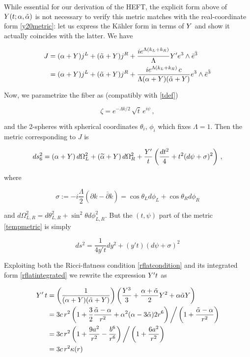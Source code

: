 While essential for our derivation of the HEFT, the explicit form above of $Y(t;\alpha,\tilde\alpha)$ is not necessary to verify this metric matches with the real-coordinate form \eqref{y20metric}: let us express the K\"ahler form in terms of $Y$ and show it actually coincides with the latter. We have

\begin{align}
	\label{Jintermsofy}
	J & =  (\alpha + Y) j^L + (\tilde{\alpha} + Y) j^R + \frac{ie^{\Lambda (k_L + k_R)}}\Lambda Y' e^3 \wedge \bar e^{\bar 3}\\
	  & =  (\alpha + Y) j^L + (\tilde{\alpha} + Y) j^R + \frac{ie^{\Lambda (k_L + k_R)} \,c}{\Lambda (\alpha + Y)(\tilde{\alpha} + Y)} e^3 \wedge \bar e^{\bar 3}
\end{align}

Now, we parametrize the fiber as (compatibly with \eqref{tdef}) 

\begin{equation}
	\zeta = e^{-\Lambda k/2}\, \sqrt{t} \,e^{i\psi}\,,
\end{equation}

and the 2-spheres with spherical coordinates $\theta_i$, $\phi_i$ which fixes $\Lambda = 1$. Then the metric corresponding to $J$ is

\begin{equation}
	ds_6^2 = (\alpha+Y)\, d\Omega^2_L + (\widetilde{\alpha} + Y) \,d\Omega^2_R + \frac{Y'}{t} \left( \frac{dt^2}{4} + t^2 (d\psi + \sigma)^2 \right)\,,\label{tempmetric}
\end{equation}

where 

\begin{equation}
	\sigma := -i\frac{\Lambda}{2}(\partial k - \bar \partial k) = \cos\theta_L d\phi_L + \cos\theta_R d\phi_R
	\label{}
\end{equation}

and $d\Omega_{L,R}^2 = d\theta_{L,R}^2 + \sin^2\theta  d\phi^2_{L,R}$. But the $(t,\psi)$ part of the metric \eqref{tempmetric} is simply

\begin{equation}
	ds^2 = \frac{1}{4y't} dy^2 + (y' t) (d\psi + \sigma)^2
\end{equation}

Exploiting both the Ricci-flatness condition \eqref{rflatcondition} and its integrated form \eqref{rflatintegrated} we rewrite the expression $Y't$ as

\begin{align}
	Y'\,t & = \left(\frac{1}{(\alpha + Y)(\tilde\alpha + Y)}\right) \left( \frac{Y^3}{3} + \frac{\alpha + \tilde{\alpha}}{2} Y^2 + \alpha \tilde{\alpha} Y \right)\\
	& = 3c\,r^2 \left(
	{1+ \frac{3}{2} \frac{\tilde{\alpha} - \alpha}{r^2} + {\alpha^{2}(\alpha - 3 \tilde{\alpha})}{2r^6} }
	\right)\bigg/\left({1+ \frac{\tilde{\alpha} -\alpha}{r^2} }\right)\\
	& = 3c\,r^2 \left({1+\frac{9a^2}{r^2} - \frac{b^6}{r^6}}\right)\bigg/\left({1 + \frac{6a^2}{r^2}}\right) \\
	& = 3c\,r^2 \kappa(r)
\end{align}

